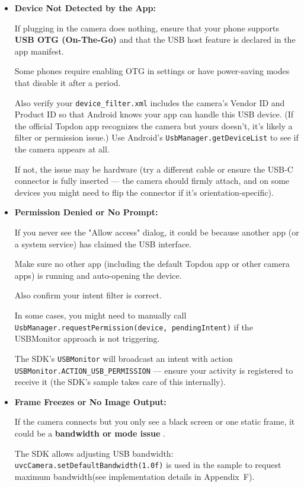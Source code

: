 {\begin{itemize}
\item \textbf{Device Not Detected by the App:}

If plugging in the camera does nothing, ensure that your phone supports \textbf{USB OTG (On-The-Go)}
 and that the USB host feature is declared in the app manifest.

Some phones require enabling OTG in settings or have power-saving modes that
disable it after a period.

Also verify your \texttt{device_filter.xml} includes the camera's Vendor ID and
Product ID so that Android knows your app can handle this USB device. (If the
official Topdon app recognizes the camera but yours doesn't, it's likely a
filter or permission issue.) Use Android's \texttt{UsbManager.getDeviceList} to
see if the camera appears at all.

If not, the issue may be hardware (try a different cable or ensure the USB-C
connector is fully inserted --- the camera should firmly attach, and on some
devices you might need to flip the connector if it's orientation-specific).

\item \textbf{Permission Denied or No Prompt:}

If you never see the "Allow access" dialog, it could be because another app (or
a system service) has claimed the USB interface.

Make sure no other app (including the default Topdon app or other camera apps)
is running and auto-opening the device.

Also confirm your intent filter is correct.

In some cases, you might need to manually call
\texttt{UsbManager.requestPermission(device, pendingIntent)} if the USBMonitor
approach is not triggering.

The SDK's \texttt{USBMonitor} will broadcast an intent with action
\texttt{USBMonitor.ACTION_USB_PERMISSION} --- ensure your activity is registered
to receive it (the SDK's sample takes care of this internally).

\item \textbf{Frame Freezes or No Image Output:}

If the camera connects but you only see a black screen or one static frame, it could be a \textbf{bandwidth or mode issue}
.

The SDK allows adjusting USB bandwidth:
\texttt{uvcCamera.setDefaultBandwidth(1.0f)} is used in the sample to request
maximum bandwidth(see implementation details in Appendix~F).


\end{itemize}}
